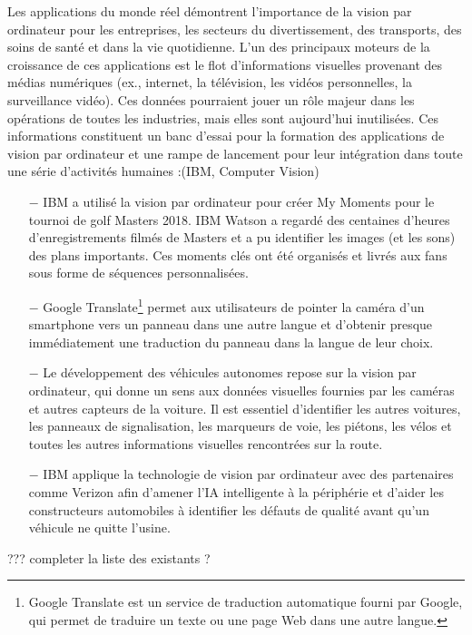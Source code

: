 		Les applications du monde réel démontrent l'importance de la vision par ordinateur pour les entreprises, les secteurs du divertissement, des transports, des soins de santé et dans la vie quotidienne. L'un des principaux moteurs de la croissance de ces applications est le flot d'informations visuelles provenant des médias numériques (ex., internet, la télévision, les vidéos personnelles, la surveillance vidéo).
		Ces données pourraient jouer un rôle majeur dans les opérations de toutes les industries, mais elles sont aujourd'hui inutilisées. Ces informations constituent un banc d'essai pour la formation des applications de vision par ordinateur et une rampe de lancement pour leur intégration dans toute une série d'activités humaines :(IBM, Computer Vision)
		
		\begin{itemize}
			\item[$-$] IBM a utilisé la vision par ordinateur pour créer My Moments pour le tournoi de golf Masters 2018. IBM Watson a regardé des centaines d'heures d'enregistrements filmés de Masters et a pu identifier les images (et les sons) des plans importants. Ces moments clés ont été organisés et livrés aux fans sous forme de séquences personnalisées.
			\item[$-$] Google Translate\footnote{Google Translate est un service de traduction automatique fourni par Google, qui permet de traduire un texte ou une page Web dans une autre langue.} permet aux utilisateurs de pointer la caméra d'un smartphone vers un panneau dans une autre langue et d'obtenir presque immédiatement une traduction du panneau dans la langue de leur choix.
			\item[$-$] Le développement des véhicules autonomes repose sur la vision par ordinateur, qui donne un sens aux données visuelles fournies par les caméras et autres capteurs de la voiture. Il est essentiel d'identifier les autres voitures, les panneaux de signalisation, les marqueurs de voie, les piétons, les vélos et toutes les autres informations visuelles rencontrées sur la route.
			\item[$-$] IBM applique la technologie de vision par ordinateur avec des partenaires comme Verizon afin d'amener l'IA intelligente à la périphérie et d'aider les constructeurs automobiles à identifier les défauts de qualité avant qu'un véhicule ne quitte l'usine.
		\end{itemize}
		
		??? completer la liste des existants ?
		
